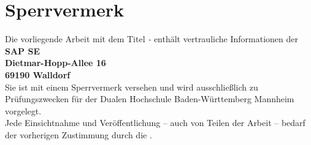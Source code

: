 \chapter*{Sperrvermerk}
Die vorliegende Arbeit mit dem Titel {\itshape \titel - \untertitel} enthält vertrauliche Informationen der\\

\textbf{SAP SE\\
Dietmar-Hopp-Allee 16\\
69190 Walldorf}\\

Sie ist mit einem Sperrvermerk versehen und wird ausschließlich zu Prüfungszwecken für {\studiengang} der Dualen Hochschule Baden-Württemberg Mannheim vorgelegt.\\
Jede Einsichtnahme und Veröffentlichung – auch von Teilen der Arbeit – bedarf der vorherigen Zustimmung durch die {\firma}.


%
%
%
%
%













